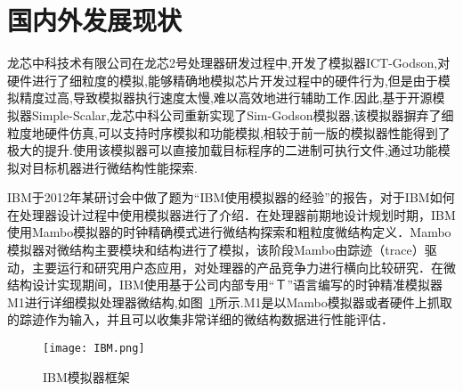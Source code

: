 \section{国内外发展现状}
龙芯中科技术有限公司\cite{zhang2007sim,gao2007simos}在龙芯2号处理器研发过程中,开发了模拟器ICT-Godson,对硬件进行了细粒度的模拟,能够精确地模拟芯片开发过程中的硬件行为,但是由于模拟精度过高,导致模拟器执行速度太慢,难以高效地进行辅助工作.因此,基于开源模拟器Simple-Scalar\cite{austin2002simplescalar},龙芯中科公司重新实现了Sim-Godson模拟器\cite{zhang2007sim},该模拟器摒弃了细粒度地硬件仿真,可以支持时序模拟和功能模拟\cite{zhang2007sim},相较于前一版的模拟器性能得到了极大的提升.使用该模拟器可以直接加载目标程序的二进制可执行文件,通过功能模拟对目标机器进行微结构性能探索\cite{desikan2001sim}.


IBM于2012年某研讨会中做了题为“IBM使用模拟器的经验”的报告\cite{kistlerexperiences}，对于IBM如何在处理器设计过程中使用模拟器进行了介绍．在处理器前期地设计规划时期，IBM使用Mambo\cite{boh}模拟器的时钟精确模式进行微结构探索和粗粒度微结构定义．Mambo模拟器对微结构主要模块和结构进行了模拟，该阶段Mambo由踪迹（trace）驱动，主要运行和研究用户态应用，对处理器的产品竞争力进行横向比较研究\cite{kistlerexperiences}．在微结构设计实现期间，IBM使用基于公司内部专用“Ｔ”语言编写的时钟精准模拟器M1进行详细模拟处理器微结构\cite{kistlerexperiences},如图~\ref{fig:IBM}所示.M1是以Mambo模拟器或者硬件上抓取的踪迹作为输入，并且可以收集非常详细的微结构数据进行性能评估．
\begin{figure}[h]
  \centering
  \texttt{[image: IBM.png]}
  \caption{IBM模拟器框架}
  \label{fig:IBM}
\end{figure}  


